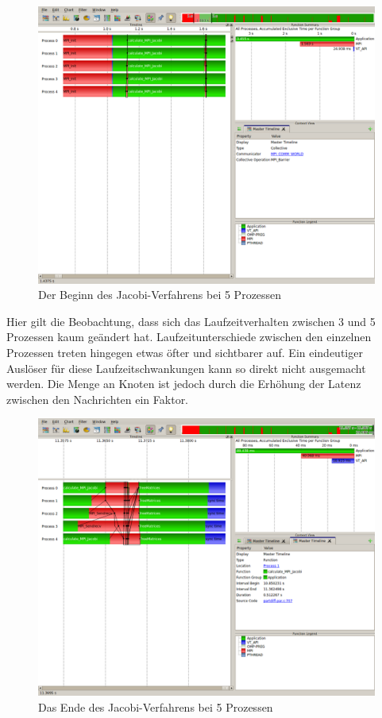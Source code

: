 \documentclass[a4paper,12pt]{scrartcl}
\begin{document}
\begin{figure}[hr!]
 \includegraphics[scale=0.45]{./5_4_JA/Start.png}
 \caption{Der Beginn des Jacobi-Verfahrens bei 5 Prozessen}
\end{figure}
Hier gilt die Beobachtung, dass sich das Laufzeitverhalten zwischen 3 und 5 Prozessen kaum geändert hat. Laufzeitunterschiede zwischen den einzelnen Prozessen treten hingegen etwas öfter und sichtbarer auf. Ein eindeutiger Auslöser für diese Laufzeitschwankungen kann so direkt nicht ausgemacht werden. Die Menge an Knoten ist jedoch  durch die Erhöhung der Latenz zwischen den Nachrichten ein Faktor. 
\FloatBarrier
\begin{figure}[hr!]
 \includegraphics[scale=0.45]{./5_4_JA/End.png}
 \caption{Das Ende des Jacobi-Verfahrens bei 5 Prozessen}
\end{figure}
\end{document}
